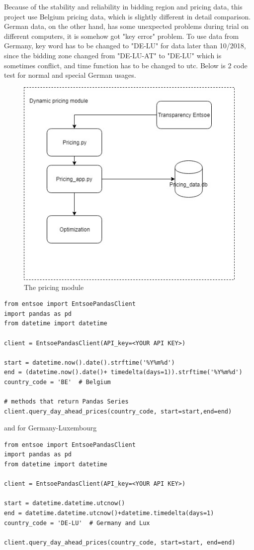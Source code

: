 \documentclass[runningheads]{llncs}
\begin{document}
Because of the stability and reliability in bidding region and pricing data, this project use Belgium pricing data, which is slightly different in detail comparison. German data, on the other hand, has some unexpected problems during trial on different computers, it is somehow got "key error" problem. To use data from Germany, key word has to be changed to "DE-LU" for data later than 10/2018, since the bidding zone changed from "DE-LU-AT" to "DE-LU" which is sometimes conflict, and time function has to be changed to utc. Below is 2 code test for normal and special German usages. \newline

\begin{figure}[H]
	\centering
	\includegraphics[width=0.7\columnwidth]{pricing.jpg}
	\caption{The pricing module}
	\label{img:control_module}
\end{figure}

\begin{lstlisting}
from entsoe import EntsoePandasClient
import pandas as pd
from datetime import datetime

client = EntsoePandasClient(API_key=<YOUR API KEY>)

start = datetime.now().date().strftime('%Y%m%d')
end = (datetime.now().date()+ timedelta(days=1)).strftime('%Y%m%d')
country_code = 'BE'  # Belgium

# methods that return Pandas Series
client.query_day_ahead_prices(country_code, start=start,end=end)
\end{lstlisting} 

\medskip
{\raggedleft and for Germany-Luxembourg}
\medskip

\begin{lstlisting}
from entsoe import EntsoePandasClient
import pandas as pd
from datetime import datetime

client = EntsoePandasClient(API_key=<YOUR API KEY>)

start = datetime.datetime.utcnow()
end = datetime.datetime.utcnow()+datetime.timedelta(days=1)
country_code = 'DE-LU'  # Germany and Lux

client.query_day_ahead_prices(country_code, start=start, end=end)

\end{lstlisting}
\end{document}
